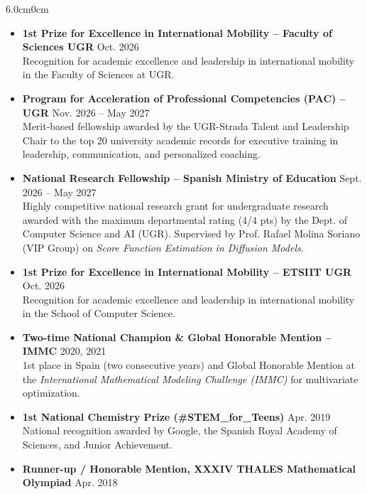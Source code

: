 \documentclass[10pt, a4paper]{article}
\begin{document}
\begin{adjustwidth}{6.0cm}{0cm}

\begin{itemize}[leftmargin=*, nosep, topsep=1pt, itemsep=1.5pt]
    \item \textbf{\color{darktext}\footnotesize 1st Prize for Excellence in International Mobility -- Faculty of Sciences UGR} \hfill {\scriptsize\color{lightgray} Oct. 2026}\\
    {\scriptsize Recognition for academic excellence and leadership in international mobility in the Faculty of Sciences at UGR.}
    \item \textbf{\color{darktext}\footnotesize Program for Acceleration of Professional Competencies (PAC) -- UGR} \hfill {\scriptsize\color{lightgray} Nov. 2026 -- May 2027}\\
    {\scriptsize Merit-based fellowship awarded by the UGR-Strada Talent and Leadership Chair to the top 20 university academic records for executive training in leadership, communication, and personalized coaching.}
    \item \textbf{\color{darktext}\footnotesize National Research Fellowship -- Spanish Ministry of Education} \hfill {\scriptsize\color{lightgray} Sept. 2026 -- May 2027}\\
    {\scriptsize Highly competitive national research grant for undergraduate research awarded with the maximum departmental rating (4/4 pts) by the Dept. of Computer Science and AI (UGR). Supervised by Prof. Rafael Molina Soriano (VIP Group) on \textit{Score Function Estimation in Diffusion Models}.}
    \item \textbf{\color{darktext}\footnotesize 1st Prize for Excellence in International Mobility -- ETSIIT UGR} \hfill {\scriptsize\color{lightgray} Oct. 2026}\\
    {\scriptsize Recognition for academic excellence and leadership in international mobility in the School of Computer Science.}
    \item \textbf{\color{darktext}\footnotesize Two-time National Champion \& Global Honorable Mention -- IMMC} \hfill {\scriptsize\color{lightgray} 2020, 2021}\\
    {\scriptsize 1st place in Spain (two consecutive years) and Global Honorable Mention at the \textit{International Mathematical Modeling Challenge (IMMC)} for multivariate optimization.}
    \item \textbf{\color{darktext}\footnotesize 1st National Chemistry Prize (\#STEM\_for\_Teens)} \hfill {\scriptsize\color{lightgray} Apr. 2019}\\
    {\scriptsize National recognition awarded by Google, the Spanish Royal Academy of Sciences, and Junior Achievement.}
    \item \textbf{\color{darktext}\footnotesize Runner-up / Honorable Mention, XXXIV THALES Mathematical Olympiad} \hfill {\scriptsize\color{lightgray} Apr. 2018}
\end{itemize}

\end{adjustwidth}
\end{document}

